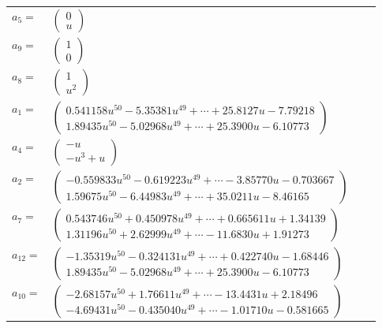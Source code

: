 \documentclass[1p]{elsarticle_modified}
\theoremstyle{definition}
\begin{document}
\begin{tabular}{m{7pt} m{180pt} m{7pt} m{180pt} }
\flushright $a_{5}=$&$\begin{pmatrix}0\\u\end{pmatrix}$ \\
\flushright $a_{9}=$&$\begin{pmatrix}1\\0\end{pmatrix}$ \\
\flushright $a_{8}=$&$\begin{pmatrix}1\\u^2\end{pmatrix}$ \\
\flushright $a_{1}=$&$\begin{pmatrix}0.541158 u^{50}-5.35381 u^{49}+\cdots+25.8127 u-7.79218\\1.89435 u^{50}-5.02968 u^{49}+\cdots+25.3900 u-6.10773\end{pmatrix}$ \\
\flushright $a_{4}=$&$\begin{pmatrix}- u\\- u^3+u\end{pmatrix}$ \\
\flushright $a_{2}=$&$\begin{pmatrix}-0.559833 u^{50}-0.619223 u^{49}+\cdots-3.85770 u-0.703667\\1.59675 u^{50}-6.44983 u^{49}+\cdots+35.0211 u-8.46165\end{pmatrix}$ \\
\flushright $a_{7}=$&$\begin{pmatrix}0.543746 u^{50}+0.450978 u^{49}+\cdots+0.665611 u+1.34139\\1.31196 u^{50}+2.62999 u^{49}+\cdots-11.6830 u+1.91273\end{pmatrix}$ \\
\flushright $a_{12}=$&$\begin{pmatrix}-1.35319 u^{50}-0.324131 u^{49}+\cdots+0.422740 u-1.68446\\1.89435 u^{50}-5.02968 u^{49}+\cdots+25.3900 u-6.10773\end{pmatrix}$ \\
\flushright $a_{10}=$&$\begin{pmatrix}-2.68157 u^{50}+1.76611 u^{49}+\cdots-13.4431 u+2.18496\\-4.69431 u^{50}-0.435040 u^{49}+\cdots-1.01710 u-0.581665\end{pmatrix}$ \\

\end{tabular}
\end{document}
